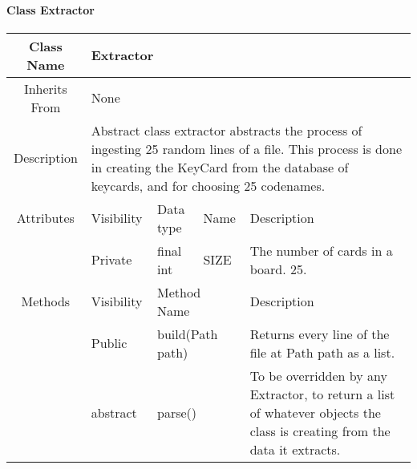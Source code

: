 \paragraph{Class Extractor}\mbox{}
\begin{tabularx}{\textwidth}{|c||l|l|l|X|}
    \hline
    \cellcolor{lightgray}Class Name & \multicolumn{4}{X|}{Extractor}\\
    \hline
    \cellcolor{lightgray}Inherits From & \multicolumn{4}{X|}{None}\\
    \hline
    \cellcolor{lightgray}Description & \multicolumn{4}{p{12cm}|}{Abstract class extractor abstracts the process of ingesting 25 random lines of a file. This process is done in creating the KeyCard from the database of keycards, and for choosing 25 codenames.}\\
    \hline\hline
    \cellcolor{lightgray}Attributes & \cellcolor{lightgray}Visibility & \cellcolor{lightgray}Data type & \cellcolor{lightgray}Name & \cellcolor{lightgray}Description\\\cline{2-5}
    \cellcolor{lightgray} & Private & final int & SIZE & The number of cards in a board. 25.\\
    \hline\hline
    \cellcolor{lightgray}Methods & \cellcolor{lightgray}Visibility & \multicolumn{2}{l|}{\cellcolor{lightgray}Method Name} & \cellcolor{lightgray}Description\\\cline{2-5}
    \cellcolor{lightgray} & Public & \multicolumn{2}{l|}{build(Path path)} & Returns every line of the file at Path path as a list.\\
    \hline
    \cellcolor{lightgray} & abstract & \multicolumn{2}{l|}{parse()} & To be overridden by any Extractor, to return a list of whatever objects the class is creating from the data it extracts.\\
    \hline
\end{tabularx}